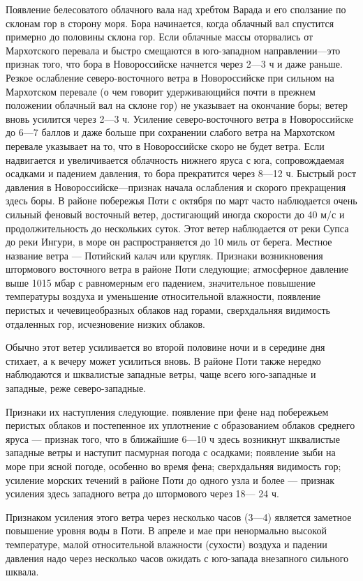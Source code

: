 Появление белесоватого облачного вала над хребтом Варада и его сползание по склонам гор в сторону моря. Бора начинается, когда облачный вал спустится примерно до половины склона гор.
Если облачные массы оторвались от Мархотского перевала и быстро смещаются в юго-западном направлении—это признак того, что бора в Новороссийске начнется через 2—3 ч и даже раньше.
Резкое ослабление северо-восточного ветра в Новороссийске при сильном на Мархотском перевале (о чем говорит удерживающийся почти в прежнем положении облачный вал на склоне гор) не указывает на окончание боры; ветер вновь усилится через 2—3 ч.
Усиление северо-восточного ветра в Новороссийске до 6—7 баллов и даже больше при сохранении слабого ветра на Мархотском перевале указывает на то, что в Новороссийске скоро не будет ветра.
Если надвигается и увеличивается облачность нижнего яруса с юга, сопровождаемая осадками и падением давления, то бора прекратится через 8—12 ч.
Быстрый рост давления в Новороссийске—признак начала ослабления и скорого прекращения здесь боры.
В районе побережья Поти с октября по март часто наблюдается очень сильный феновый восточный ветер, достигающий иногда скорости до 40 м/с и продолжительность до нескольких суток. Этот ветер наблюдается от реки Супса до реки Ингури, в море он распространяется до 10 миль от берега. Местное название ветра — Потийский калач или кругляк. Признаки возникновения штормового восточного ветра в районе Поти следующие; атмосферное давление выше 1015 мбар с равномерным его падением, значительное повышение температуры воздуха и уменьшение относительной влажности, появление перистых и чечевицеобразных облаков над горами, сверхдальняя видимость отдаленных гор, исчезновение низких облаков.

Обычно этот ветер усиливается во второй половине ночи и в середине дня стихает, а к вечеру может усилиться вновь. В районе Поти также нередко наблюдаются и шквалистые западные ветры, чаще всего юго-западные и западные, реже северо-западные.

Признаки их наступления следующие. появление при фене над побережьем перистых облаков и постепенное их уплотнение с образованием облаков среднего яруса — признак того, что в ближайшие 6—10 ч здесь возникнут шквалистые западные ветры и наступит пасмурная погода с осадками; появление зыби на море при ясной погоде, особенно во время фена; сверхдальняя видимость гор; усиление морских течений в районе Поти до одного узла и более — признак усиления здесь западного ветра до штормового через 18— 24 ч.

Признаком усиления этого ветра через несколько часов (3—4) является заметное повышение уровня воды в Поти. В апреле и мае при ненормально высокой температуре, малой относительной влажности (сухости) воздуха и падении давления надо через несколько часов ожидать с юго-запада внезапного сильного шквала.

